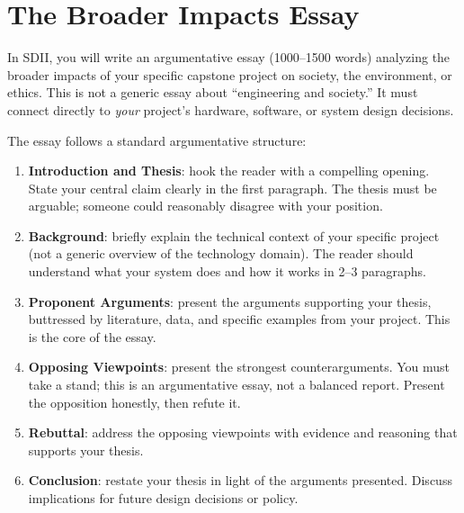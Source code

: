 \section{The Broader Impacts Essay}
In SDII, you will write an argumentative essay (1000--1500 words) analyzing the broader impacts of your specific capstone project on society, the environment, or ethics. This is not a generic essay about ``engineering and society.'' It must connect directly to \emph{your} project's hardware, software, or system design decisions.

The essay follows a standard argumentative structure:
\begin{enumerate}[nosep,leftmargin=1.5em]
\item \textbf{Introduction and Thesis}: hook the reader with a compelling opening. State your central claim clearly in the first paragraph. The thesis must be arguable; someone could reasonably disagree with your position.
\item \textbf{Background}: briefly explain the technical context of your specific project (not a generic overview of the technology domain). The reader should understand what your system does and how it works in 2--3 paragraphs.
\item \textbf{Proponent Arguments}: present the arguments supporting your thesis, buttressed by literature, data, and specific examples from your project. This is the core of the essay.
\item \textbf{Opposing Viewpoints}: present the strongest counterarguments. You must take a stand; this is an argumentative essay, not a balanced report. Present the opposition honestly, then refute it.
\item \textbf{Rebuttal}: address the opposing viewpoints with evidence and reasoning that supports your thesis.
\item \textbf{Conclusion}: restate your thesis in light of the arguments presented. Discuss implications for future design decisions or policy.
\end{enumerate}

